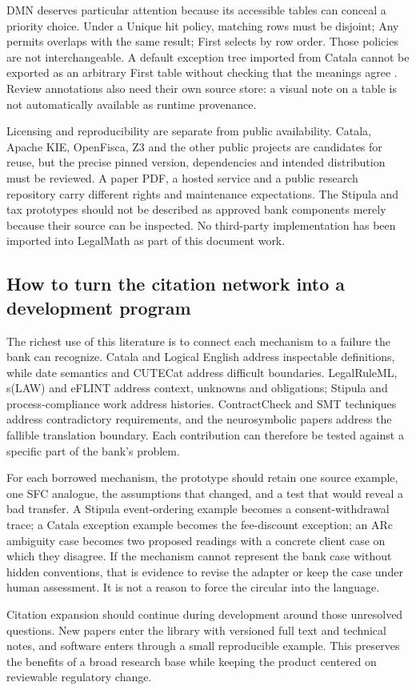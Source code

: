 DMN deserves particular attention because its accessible tables can conceal a
priority choice. Under a Unique hit policy, matching rows must be disjoint; Any
permits overlaps with the same result; First selects by row order. Those policies
are not interchangeable. A default exception tree imported from Catala cannot be
exported as an arbitrary First table without checking that the meanings agree
\citep[sec.~8.2.11]{dmn2024}. Review annotations also need their own source store:
a visual note on a table is not automatically available as runtime provenance.

Licensing and reproducibility are separate from public availability. Catala,
Apache KIE, OpenFisca, Z3 and the other public projects are candidates for reuse,
but the precise pinned version, dependencies and intended distribution must be
reviewed. A paper PDF, a hosted service and a public research repository carry
different rights and maintenance expectations. The Stipula and tax prototypes
should not be described as approved bank components merely because their source
can be inspected. No third-party implementation has been imported into LegalMath
as part of this document work.

\subsection{How to turn the citation network into a development program}

The richest use of this literature is to connect each mechanism to a failure the
bank can recognize. Catala and Logical English address inspectable definitions,
while date semantics and CUTECat address difficult boundaries. LegalRuleML,
s(LAW) and eFLINT address context, unknowns and obligations; Stipula and
process-compliance work address histories. ContractCheck and SMT techniques
address contradictory requirements, and the neurosymbolic papers address the
fallible translation boundary. Each contribution can therefore be tested against
a specific part of the bank's problem.

For each borrowed mechanism, the prototype should retain one source example,
one SFC analogue, the assumptions that changed, and a test that would reveal a
bad transfer. A Stipula event-ordering example becomes a consent-withdrawal trace;
a Catala exception example becomes the fee-discount exception; an ARc ambiguity
case becomes two proposed readings with a concrete client case on which they
disagree. If the mechanism cannot represent the bank case without hidden
conventions, that is evidence to revise the adapter or keep the case under human
assessment. It is not a reason to force the circular into the language.

Citation expansion should continue during development around those unresolved
questions. New papers enter the library with versioned full text and technical
notes, and software enters through a small reproducible example. This preserves
the benefits of a broad research base while keeping the product centered on
reviewable regulatory change.
